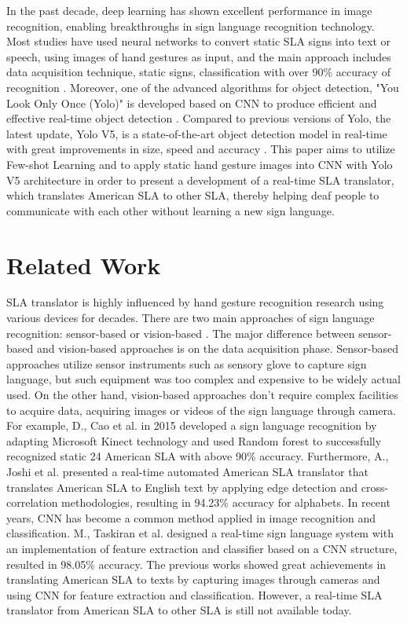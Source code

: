 \documentclass[a4paper]{article}
\begin{document}
In the past decade, deep learning has shown excellent performance in image recognition, enabling breakthroughs in sign language recognition technology. Most studies have used neural networks to convert static SLA signs into text or speech, using images of hand gestures as input, and the main approach includes data acquisition technique, static signs, classification with over 90\% accuracy of recognition \cite{wadhawan2021sign}. Moreover, one of the advanced algorithms for object detection, "You Look Only Once (Yolo)" is developed based on CNN to produce efficient and effective real-time object detection \cite{7780460}. Compared to previous versions of Yolo, the latest update, Yolo V5, is a state-of-the-art object detection model in real-time with great improvements in size, speed and accuracy \cite{glenn_jocher_2021_4679653}. This paper aims to utilize Few-shot Learning and to apply static hand gesture images into CNN with Yolo V5 architecture in order to present a development of a real-time SLA translator, which translates American SLA to other SLA, thereby helping deaf people to communicate with each other without learning a new sign language. 
  
\section{Related Work}
SLA translator is highly influenced by hand gesture recognition research using various devices for decades. There are two main approaches of sign language recognition: sensor-based or vision-based \cite{Cheok2019ARO}. The major difference between sensor-based and vision-based approaches is on the data acquisition phase. Sensor-based approaches utilize sensor instruments such as sensory glove to capture sign language, but such equipment was too complex and expensive to be widely actual used. On the other hand, vision-based approaches don't require complex facilities to acquire data, acquiring images or videos of the sign language through camera. For example, D., Cao et al.\cite{7301347} in 2015 developed a sign language recognition by adapting Microsoft Kinect technology and used Random forest to successfully recognized static 24 American SLA with above 90\% accuracy. Furthermore, A., Joshi et al.\cite{8088212} presented a real-time automated American SLA translator that translates American SLA to English text by applying edge detection and cross-correlation methodologies, resulting in 94.23\% accuracy for alphabets. In recent years, CNN has become a common method applied in image recognition and classification. M., Taskiran et al.\cite{8441304} designed a real-time sign language system with an implementation of feature extraction and classifier based on a CNN structure, resulted in 98.05\% accuracy.
The previous works showed great achievements in translating American SLA to texts by capturing images through cameras and using CNN for feature extraction and classification. However, a real-time SLA translator from American SLA to other SLA is still not available today.
\end{document}
